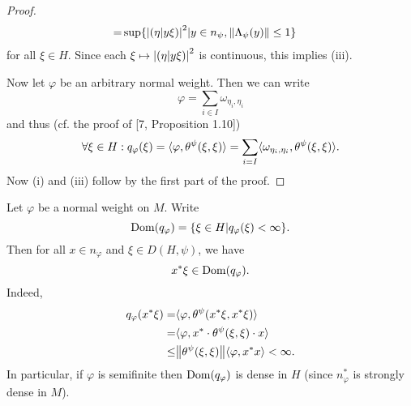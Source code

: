 \begin{proof}
\[\begin{split}
            =&\sup\{\abs{(\eta|y\xi)}^2|y\in n_\psi,\norm{\Lambda_\psi(y)}\leq 1\}
        \end{split}
    \]
    for all $\xi\in H$. Since each $\xi\mapsto \abs{(\eta|y\xi)}^2$ is continuous, this implies (iii).\par
    Now let $\varphi$ be an arbitrary normal weight. Then we can write
    \[
        \varphi=\sum_{i\in I}\omega_{\eta_i,\eta_i}
    \]
    and thus (cf. the proof of [7, Proposition 1.10])
    \[
        \forall \xi\in H:  q_\varphi(\xi)=\langle\varphi,\theta^\psi(\xi,\xi)\rangle=\sum_{i=I}\langle\omega_{\eta_i,\eta_i},\theta^\psi(\xi,\xi)\rangle.
    \]
    Now (i) and (iii) follow by the first part of the proof.
\end{proof}
\begin{remark}
    Let $\varphi$ be a normal weight on $M$. Write
    \begin{equation}
        \operatorname{Dom}(q_\varphi)=\{\xi\in H|q_\varphi(\xi)<\infty\}.
    \end{equation}
    Then for all $x\in n_\varphi$ and $\xi\in D(H,\psi)$, we have
    \begin{equation}
        x^*\xi\in \operatorname{Dom}(q_\varphi).
    \end{equation}
    Indeed,
    \[
        \begin{split}
            q_\varphi(x^*\xi)=&\langle\varphi,\theta^\psi(x^*\xi,x^*\xi)\rangle\\
            =&\langle\varphi,x^*\cdot\theta^\psi(\xi,\xi)\cdot x\rangle\\
            \leq &\norm{\theta^\psi(\xi,\xi)}\langle\varphi,x^*x\rangle<\infty.
        \end{split}
    \]
    In particular, if $\varphi$ is semifinite then $\operatorname{Dom}(q_\varphi)$ is dense in $H$ (since $n_\varphi^*$ is strongly dense in $M$).
\end{remark}
% 